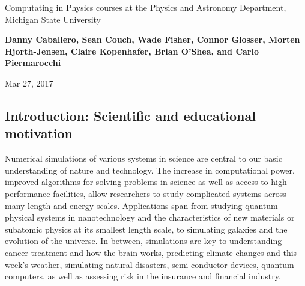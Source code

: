 \documentclass[%
oneside,                 %
final,                   %
10pt]{article}
\begin{document}

\newcommand{\exercisesection}[1]{\subsection*{#1}}






\thispagestyle{empty}

\begin{center}
{\LARGE\bf
\begin{spacing}{1.25}
Computating in Physics courses  at the Physics and Astronomy Department, Michigan State University
\end{spacing}
}
\end{center}


\begin{center}
{\bf Danny Caballero, Sean Couch, Wade Fisher, Connor Glosser, Morten Hjorth-Jensen, Claire Kopenhafer, Brian O'Shea, and Carlo Piermarocchi${}^{}$} \\ [0mm]
\end{center}

\begin{center}
\end{center}
    

\begin{center}
Mar 27, 2017
\end{center}

\vspace{1cm}


\subsection*{Introduction: Scientific and educational motivation}

Numerical simulations of various systems in science are central to our
basic understanding of nature and technology.
The increase in computational power,
improved algorithms for solving problems in science as well as access
to high-performance facilities, allow researchers to study
complicated systems across many length and energy scales. Applications
span from studying quantum physical systems in nanotechnology and the
characteristics of new materials or subatomic physics at its smallest
length scale, to simulating galaxies and the evolution of the universe.
In between, simulations are key to understanding
cancer treatment and how the brain works,
predicting climate changes and this week's weather,
simulating natural disasters, semi-conductor devices,
quantum computers, as well as assessing risk in the insurance and
financial industry.
\end{document}
